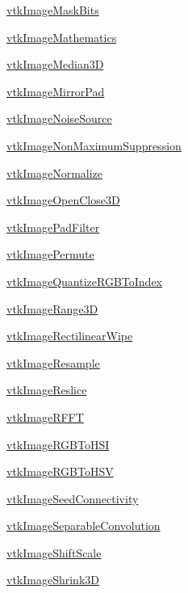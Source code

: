 \begin{DoxyItemize}
\item \hyperlink{vtkimaging_vtkimagemaskbits}{vtk\-Image\-Mask\-Bits}  
\item \hyperlink{vtkimaging_vtkimagemathematics}{vtk\-Image\-Mathematics}  
\item \hyperlink{vtkimaging_vtkimagemedian3d}{vtk\-Image\-Median3\-D}  
\item \hyperlink{vtkimaging_vtkimagemirrorpad}{vtk\-Image\-Mirror\-Pad}  
\item \hyperlink{vtkimaging_vtkimagenoisesource}{vtk\-Image\-Noise\-Source}  
\item \hyperlink{vtkimaging_vtkimagenonmaximumsuppression}{vtk\-Image\-Non\-Maximum\-Suppression}  
\item \hyperlink{vtkimaging_vtkimagenormalize}{vtk\-Image\-Normalize}  
\item \hyperlink{vtkimaging_vtkimageopenclose3d}{vtk\-Image\-Open\-Close3\-D}  
\item \hyperlink{vtkimaging_vtkimagepadfilter}{vtk\-Image\-Pad\-Filter}  
\item \hyperlink{vtkimaging_vtkimagepermute}{vtk\-Image\-Permute}  
\item \hyperlink{vtkimaging_vtkimagequantizergbtoindex}{vtk\-Image\-Quantize\-R\-G\-B\-To\-Index}  
\item \hyperlink{vtkimaging_vtkimagerange3d}{vtk\-Image\-Range3\-D}  
\item \hyperlink{vtkimaging_vtkimagerectilinearwipe}{vtk\-Image\-Rectilinear\-Wipe}  
\item \hyperlink{vtkimaging_vtkimageresample}{vtk\-Image\-Resample}  
\item \hyperlink{vtkimaging_vtkimagereslice}{vtk\-Image\-Reslice}  
\item \hyperlink{vtkimaging_vtkimagerfft}{vtk\-Image\-R\-F\-F\-T}  
\item \hyperlink{vtkimaging_vtkimagergbtohsi}{vtk\-Image\-R\-G\-B\-To\-H\-S\-I}  
\item \hyperlink{vtkimaging_vtkimagergbtohsv}{vtk\-Image\-R\-G\-B\-To\-H\-S\-V}  
\item \hyperlink{vtkimaging_vtkimageseedconnectivity}{vtk\-Image\-Seed\-Connectivity}  
\item \hyperlink{vtkimaging_vtkimageseparableconvolution}{vtk\-Image\-Separable\-Convolution}  
\item \hyperlink{vtkimaging_vtkimageshiftscale}{vtk\-Image\-Shift\-Scale}  
\item \hyperlink{vtkimaging_vtkimageshrink3d}{vtk\-Image\-Shrink3\-D}  

\end{DoxyItemize}
